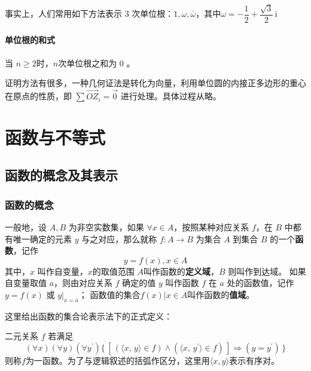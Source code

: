 \documentclass[a4paper,openany]{ctexbook}
\renewcommand{\vec}{\overrightarrow}
\newcommand{\ii}{\,\mathrm{i}}
\begin{document}
事实上，人们常用如下方法表示 \(3\) 次单位根：\(1,\omega,\overline{\omega}\)，其中\(\omega=-\dfrac{1}{2}+\dfrac{\sqrt{3}}{2}\ii\)

\subsubsection{单位根的和式}

当 \(n \ge 2\)时，\(n\)次单位根之和为 \(0\) 。

证明方法有很多，一种几何证法是转化为向量，利用单位圆的内接正多边形的重心在原点的性质，即 \(\sum \vec{OZ}_i=\vec{0}\) 进行处理。具体过程从略。

\chapter{函数与不等式}

\section{函数的概念及其表示}

\subsection{函数的概念}

一般地，设 \(A,B\) 为非空实数集，如果 \(\forall x \in A\)，按照某种对应关系 \(f\)，在 \(B\) 中都有唯一确定的元素 \(y\) 与之对应，那么就称 \(f:A\rightarrow B\)
为集合 \(A\) 到集合 \(B\) 的一个\textbf{函数}，记作\[y=f(x),x\in A\]
其中，\(x\) 叫作自变量，\(x\)的取值范围 \(A\)叫作函数的\textbf{定义域}，\(B\) 则叫作到达域。
如果自变量取值 \(a\)，则由对应关系 \(f\) 确定的值 \(y\) 叫作函数 \(f\) 在 \(a\) 处的函数值，记作 \(y=f(x)\) 或 \(y |_{x=a}\)；
函数值的集合\({f(x)|x\in A}\)叫作函数的\textbf{值域}。

这里给出函数的集合论表示法下的正式定义：

二元关系 \(f\) 若满足
\[
    (\forall x)(\forall y)(\forall y^{\prime})
    \{\,
    [\,(\langle x,\,y \rangle \in f)
            \wedge
            (\langle x,\,y^{\prime}\rangle \in f)\,]
    \Rightarrow (y=y^{\prime})
    \,\}
\]
则称\(f\)为一函数。为了与逻辑叙述的括弧作区分，这里用\(\langle x,y \rangle\)表示有序对。
\end{document}
